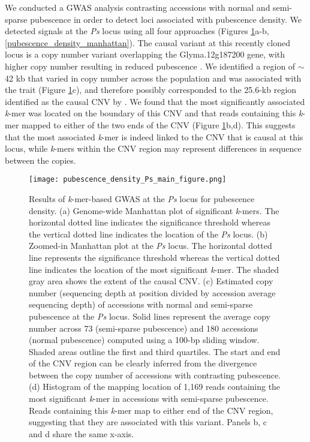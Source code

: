 We conducted a GWAS analysis contrasting accessions with normal and semi-sparse
pubes\-cence in order to detect loci associated with pubescence density. We
detected signals at the \textit{Ps} locus using all four approaches (Figures
\ref{pubescence-density-main-figure}a-b, \ref{pubescence_density_manhattan}). The causal
variant at this recently cloned locus is a copy number variant overlapping the
Glyma.12g187200 gene, with higher copy number resulting in reduced pubescence \citep{liu2020ps}.
We identified a region of $\sim$42 kb that varied in copy number across
the population and was associated with the trait (Figure
\ref{pubescence-density-main-figure}c), and therefore possibly corresponded to the
25.6-kb region identified as the causal CNV by \cite{liu2020ps}. We found that
the most significantly associated \textit{k}-mer was located on the boundary of this CNV
and that reads containing this \textit{k}-mer mapped to either of the two ends
of the CNV (Figure \ref{pubescence-density-main-figure}b,d). This suggests that
the most associated \textit{k}-mer is indeed linked to the CNV
that is causal at this locus, while \textit{k}-mers within the
CNV region may represent differences in sequence between the copies.

\begin{figure}
	\centering
	\texttt{[image: pubescence\_density\_Ps\_main\_figure.png]}
	\caption[Results of \textit{k}-mer-based GWAS at the
	\textit{Ps} locus for pubescence density.]{Results of \textit{k}-mer-based GWAS at the
	\textit{Ps} locus for pubescence density.
	(a) Genome-wide Manhattan plot of significant \textit{k}-mers. The
	horizontal dotted line indicates the significance threshold whereas the
	vertical dotted line indicates the location of the \textit{Ps} locus.
	(b) Zoomed-in Manhattan plot at the \textit{Ps} locus.  The horizontal
	dotted line represents the significance threshold whereas the
	vertical dotted line indicates the location of the most significant
	\textit{k}-mer. The shaded gray area shows the extent of the causal CNV.
	(c) Estimated copy number (sequencing depth at position divided by
	accession average sequencing depth) of accessions with normal and
	semi-sparse pubescence at the \textit{Ps} locus. Solid lines represent
	the average copy number across 73 (semi-sparse pubescence) and 180
	accessions (normal pubescence) computed using a 100-bp sliding window.
	Shaded areas outline the first and third quartiles. The start and end
	of the CNV region can be clearly inferred from the divergence between
	the copy number of accessions with contrasting pubescence.
	(d) Histogram of the mapping location of 1,169 reads containing the
	most significant \textit{k}-mer in accessions with semi-sparse pubescence.
	Reads containing this \textit{k}-mer map to either end of the CNV
	region, suggesting that they are associated with this variant. Panels
	b, c and d share the same x-axis.}
	\label{pubescence-density-main-figure}
\end{figure}

